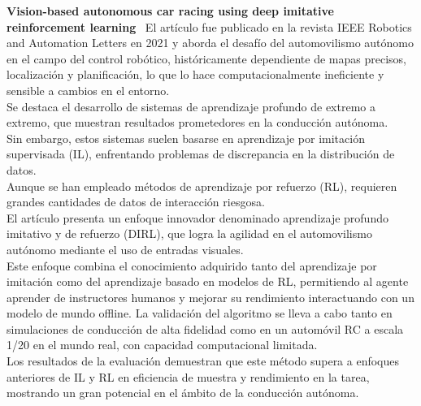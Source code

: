 \textbf{Vision-based autonomous car racing using deep imitative reinforcement learning}~\cite{cai2021vision}
El artículo fue publicado en la revista IEEE Robotics and Automation Letters en 2021 y aborda el desafío del automovilismo autónomo
en el campo del control robótico, históricamente dependiente de mapas precisos, localización y planificación, lo que lo hace
computacionalmente ineficiente y sensible a cambios en el entorno.
\\
Se destaca el desarrollo de sistemas de aprendizaje profundo de extremo a extremo, que muestran resultados prometedores en la conducción
autónoma.
\\
Sin embargo, estos sistemas suelen basarse en aprendizaje por imitación supervisada (IL), enfrentando problemas de discrepancia
en la distribución de datos.
\\
Aunque se han empleado métodos de aprendizaje por refuerzo (RL), requieren grandes cantidades de datos de interacción riesgosa.
\\
El artículo presenta un enfoque innovador denominado aprendizaje profundo imitativo y de refuerzo (DIRL), que logra la agilidad en
el automovilismo autónomo mediante el uso de entradas visuales.
\\
Este enfoque combina el conocimiento adquirido tanto del aprendizaje por imitación como del aprendizaje basado en modelos de RL,
permitiendo al agente aprender de instructores humanos y mejorar su rendimiento interactuando con un modelo de mundo offline.
La validación del algoritmo se lleva a cabo tanto en simulaciones de conducción de alta fidelidad como en un automóvil RC a escala 1/20 en
el mundo real, con capacidad computacional limitada. \\
Los resultados de la evaluación demuestran que este método supera a enfoques anteriores de IL y RL en eficiencia de muestra y rendimiento
en la tarea, mostrando un gran potencial en el ámbito de la conducción autónoma.
